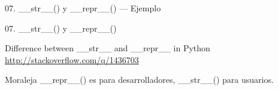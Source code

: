 \begin{frame}{07. \_\_str\_\_() y \_\_repr\_\_() — Ejemplo}
  \footnotesize
\end{frame}

\begin{frame}{07. \_\_str\_\_() y \_\_repr\_\_()}
  \small
  \begin{block}
    {\centering Difference between \_\_str\_\_ and \_\_repr\_\_ in Python}
    \centering
    \url{http://stackoverflow.com/q/1436703}
  \end{block}

  \vspace{0.5cm}
  {
    \normalsize
    \begin{alertblock}{\centering Moraleja}
      \centering
      \_\_repr\_\_() es para desarrolladores, \_\_str\_\_() para
      usuarios.
    \end{alertblock}
  }
\end{frame}
